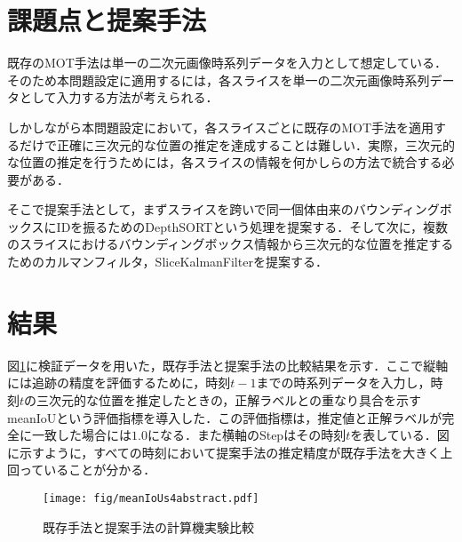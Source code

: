 \section{課題点と提案手法}

既存のMOT手法は単一の二次元画像時系列データを入力として想定している．そのため本問題設定に適用するには，各スライスを単一の二次元画像時系列データとして入力する方法が考えられる．

しかしながら本問題設定において，各スライスごとに既存のMOT手法を適用するだけで正確に三次元的な位置の推定を達成することは難しい．実際，三次元的な位置の推定を行うためには，各スライスの情報を何かしらの方法で統合する必要がある．

そこで提案手法として，まずスライスを跨いで同一個体由来のバウンディングボックスにIDを振るためのDepthSORTという処理を提案する．そして次に，複数のスライスにおけるバウンディングボックス情報から三次元的な位置を推定するためのカルマンフィルタ，SliceKalmanFilterを提案する．

\section{結果}

図\ref{fig:meanIoUs}に検証データを用いた，既存手法と提案手法の比較結果を示す．ここで縦軸には追跡の精度を評価するために，時刻$t-1$までの時系列データを入力し，時刻$t$の三次元的な位置を推定したときの，正解ラベルとの重なり具合を示すmeanIoUという評価指標を導入した．この評価指標は，推定値と正解ラベルが完全に一致した場合には$1.0$になる．また横軸のStepはその時刻$t$を表している．図に示すように，すべての時刻において提案手法の推定精度が既存手法を大きく上回っていることが分かる．

\begin{figure}[h]
    \centering
    \texttt{[image: fig/meanIoUs4abstract.pdf]}
    \caption{既存手法と提案手法の計算機実験比較}
    \label{fig:meanIoUs}
\end{figure}
